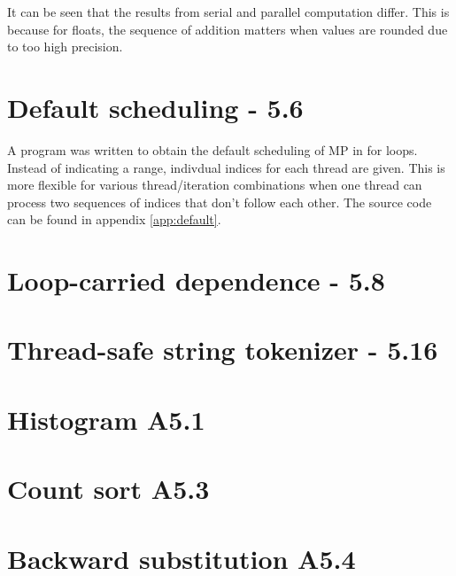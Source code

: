 \documentclass[a4paper,11pt,twoside]{article}
\begin{document}
It can be seen that the results from serial and parallel computation differ. This is because for floats, the sequence of addition matters when values are rounded due to too high precision. 

\section{Default scheduling - 5.6}
A program was written to obtain the default scheduling of MP in for loops. Instead of indicating a range, indivdual indices for each thread are given. This is more flexible for various thread/iteration combinations when one thread can process two sequences of indices that don't follow each other. The source code can be found in appendix \ref{app:default}.  

\section{Loop-carried dependence - 5.8}

\section{Thread-safe string tokenizer - 5.16}

\section{Histogram A5.1}

\section{Count sort A5.3}

\section{Backward substitution A5.4}

\appendix
\end{document}
